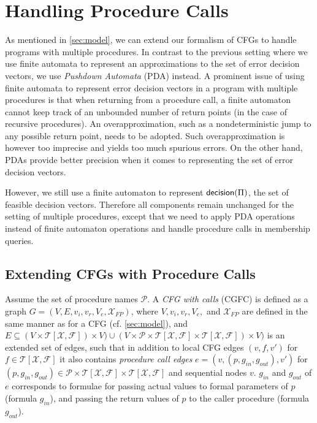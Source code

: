 \chapter{Handling Procedure Calls}\label{ch:procedure_calls}

As mentioned in \ref{sec:model}, we can extend our formalism of CFGs to handle programs with multiple procedures. In contrast to the previous setting where we use finite automata to represent an approximations to the set of error decision vectors, we use \emph{Pushdown Automata} (PDA) instead. A prominent issue of using finite automata to represent error decision vectors in a program with multiple procedures is that when returning from a procedure call, a finite automaton cannot keep track of an unbounded number of return points (in the case of recursive procedures). An overapproximation, such as a nondeterministic jump to any possible return point, needs to be adopted. Such overapproximation is however too imprecise and yields too much spurious errors. On the other hand, PDAs provide better precision when it comes to representing the set of error decision vectors. 

However, we still use a finite automaton to represent $\mathsf{decision}(\Pi)$, the set of feasible decision vectors. Therefore all components remain unchanged for the setting of multiple procedures, except that we need to apply PDA operations instead of finite automaton operations and handle procedure calls in membership queries. 

\section{Extending CFGs with Procedure Calls}\label{sec:extend_cfg}

Assume the set of procedure names $\mathcal{P}$. A \emph{CFG with calls} (CGFC) is defined as a graph $G = (V, E, v_i, v_r, V_e, \mathcal{X}_{FP})$, where $V, v_i, v_r, V_e,$ and $\mathcal{X}_{FP}$ are defined in the same manner as for a CFG (cf. \ref{sec:model}), and $E \subseteq (V \times \mathcal{T[X,F]}) \times V) \cup (V \times \mathcal{P \times T[X,F] \times T[X,F] }) \times V)$ is an extended set of edges, such that in addition to local CFG edges $(v, f, v')$ for $f \in \mathcal{T[X,F]}$ it also contains \emph{procedure call edges} $e = (v, (p, g_{in}, g_{out}), v')$ for $(p, g_{in}, g_{out}) \in \mathcal{P \times T[X,F] \times T[X,F] }$ and sequential nodes $v$. $g_{in}$ and $g_{out}$ of $e$ corresponds to formulae for passing actual values to formal parameters of $p$ (formula $g_{in}$), and passing the return values of $p$ to the caller procedure (formula $g_{out}$).

